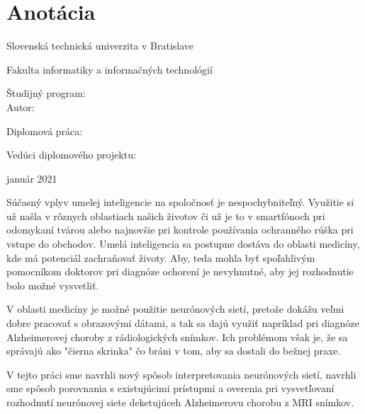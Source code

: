 
\thispagestyle{empty}
\section*{Anotácia}

\begin{minipage}[t]{1\columnwidth}%
Slovenská technická univerzita v Bratislave

Fakulta informatiky a informačných technológií

Študijný program: \myStudyProgram\\

Autor: \myName

Diplomová práca: \myTitle

Vedúci diplomového projektu: \mySupervisor

január 2021
\end{minipage}

\bigskip{}

Súčasný vplyv umelej inteligencie na spoločnosť je nespochybniteľný. Využitie si už našla v rôznych oblastiach našich životov či už je to v smartfónoch pri odomykaní tvárou alebo najnovšie pri kontrole používania ochranného rúška pri vstupe do obchodov. Umelá inteligencia sa postupne dostáva do oblasti medicíny, kde má potenciál zachraňovať životy. Aby, teda mohla byť spoľahlivým pomocníkom doktorov pri diagnóze ochorení je nevyhnutné, aby jej rozhodnutie bolo možné vysvetliť. 

V oblasti medicíny je možné použitie neurónových sietí, pretože dokážu veľmi dobre pracovať s obrazovými dátami, a tak sa dajú využiť napríklad pri diagnóze Alzheimerovej choroby z rádiologických snímkov. Ich problémom však je, že sa správajú ako "čierna skrinka" čo bráni v tom, aby sa dostali do bežnej praxe.

V tejto práci sme navrhli nový spôsob interpretovania neurónových sietí, navrhli sme spôsob porovnania s existujúcimi prístupmi a overenia pri vysvetľovaní rozhodnutí neurónovej siete deketujúceh Alzheimerovu chorobu z MRI snímkov.

\newpage
\thispagestyle{empty}
\mbox{}
\newpage